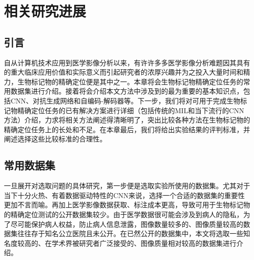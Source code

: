 \chapter{相关研究进展}
\section{引言}
自从计算机技术应用到医学影像分析以来，有许许多多医学影像分析难题因其具有的重大临床应用价值和实际意义而引起研究者的浓厚兴趣并为之投入大量时间和精力，生物标记物的精确定位便是其中之一。本章将会生物标记物精确定位任务的常用数据集进行介绍。接着将会介绍本文方法中涉及到的最为重要的基本知识点，包括CNN、对抗生成网络和自编码-解码器等。下一步，我们将对可用于完成生物标记物精确定位任务的已有解决方案进行详细（包括传统的MIL和当下流行的CNN方法）介绍，力求将相关方法阐述得清晰明了，突出比较各种方法在生物标记物的精确定位任务上的长处和不足。在本章最后，我们将给出实验结果的评判标准，并阐述选择这些比较标准的合理性。

\section{常用数据集}\label{sec:usually_ds_intro}
一旦展开对选取问题的具体研究，第一步便是选取实验所使用的数据集。尤其对于当下十分火热、有着数据驱动特性的CNN来说，选择一个合适的数据集的重要性更加不言而喻。再加上医学影像数据获取、标注成本更高，导致可用于生物标记物的精确定位测试的公开数据集较少。由于医学数据很可能会涉及到病人的隐私，为了尽可能保护病人权益，防止病人信息泄露，图像数量较多的、图像质量较高的数据集往往存于知名公立医院且未公开。在已然公开的数据集中，本文将选取一些知名度较高的、在学术界被研究者广泛接受的、图像质量相对较高的数据集进行介绍。

